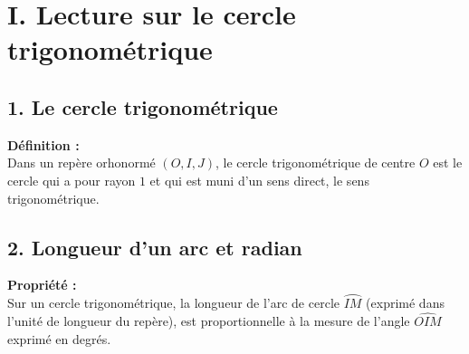 \documentclass[11pt,a4paper]{article}
\title{\doctitre}
\author{\docniveau \\ \doctheme\text{ - }\doctype}
\date{}
\begin{document}
\maketitle
\pagestyle{custom}
\thispagestyle{custom}

\section*{I. Lecture sur le cercle trigonométrique}

\begin{minipage}{0.4\textwidth}
\end{minipage}
\hfill
\begin{minipage}{0.6\textwidth}
    \subsection*{1. Le cercle trigonométrique}
    \begin{mdframed}[style=definitionStyle]
        \textbf{Définition :} ~\\
        Dans un repère orhonormé $(O, I, J)$, le cercle trigonométrique de centre $O$ est le cercle qui a pour rayon $1$ et qui est muni d'un sens direct, le sens trigonométrique.
    \end{mdframed}
    \subsection*{2. Longueur d'un arc et radian}
    \begin{mdframed}[style=proprieteStyle]
        \textbf{Propriété :} ~\\
        Sur un cercle trigonométrique, la longueur de l'arc de cercle $\wideparen{IM}$ (exprimé dans l'unité de longueur du repère), est proportionnelle à la mesure de l'angle $\widehat{OIM}$ exprimé en degrés.
    \end{mdframed}
\end{minipage}
\text{ } \\
\end{document}
